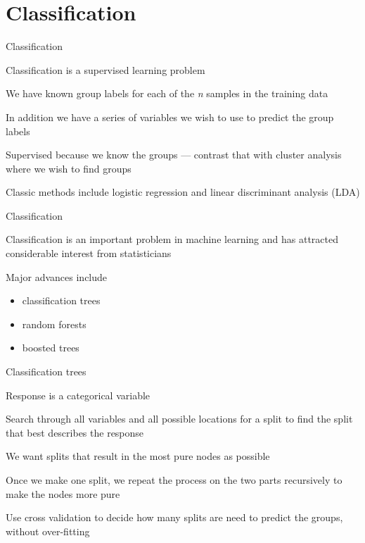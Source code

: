 \documentclass[11pt,ignorenonframetext,compress, aspectratio=169]{beamer}
\providecommand{\tightlist}{%
  \setlength{\itemsep}{0pt}\setlength{\parskip}{0pt}}
\begin{document}
\section{Classification}\label{classification}

\begin{frame}{Classification}

Classification is a supervised learning problem

We have known group labels for each of the \emph{n} samples in the
training data

In addition we have a series of variables we wish to use to predict the
group labels

Supervised because we know the groups --- contrast that with cluster
analysis where we wish to find groups

Classic methods include logistic regression and linear discriminant
analysis (LDA)

\end{frame}

\begin{frame}{Classification}

Classification is an important problem in machine learning and has
attracted considerable interest from statisticians

Major advances include

\begin{itemize}
\tightlist
\item
  classification trees
\item
  random forests
\item
  boosted trees
\end{itemize}

\end{frame}

\begin{frame}{Classification trees}

Response is a categorical variable

Search through all variables and all possible locations for a split to
find the split that best describes the response

We want splits that result in the most pure nodes as possible

Once we make one split, we repeat the process on the two parts
recursively to make the nodes more pure

Use cross validation to decide how many splits are need to predict the
groups, without over-fitting

\end{frame}
\end{document}
